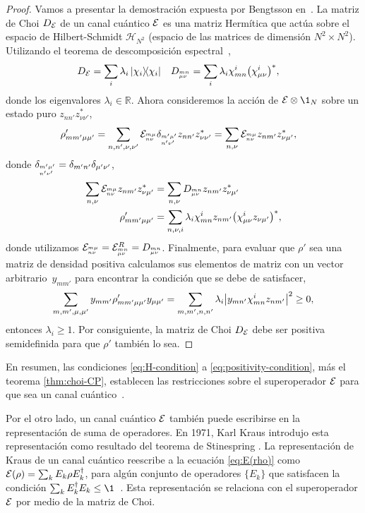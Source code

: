 \begin{proof}
Vamos a presentar la demostración expuesta por Bengtsson
en~\cite[p. 281]{bengtsson_zyczkowski_2017}.
La matriz de Choi $D_{\mathcal{E}}$ de un 
canal cuántico $\mathcal{E}$ es una matriz Hermítica que 
actúa sobre el espacio de Hilbert-Schmidt $\mathcal{H}_{N^2}$
(espacio de las matrices de dimensión $N^2\times N^2$). 
Utilizando el teorema de descomposición 
espectral~\cite{nielsen_chuang_2011},
\begin{align}
D_{\E}&=\sum_{i}\lambda_i\dyad{\chi_i}{\chi_i}
&
D_{\ind{mn}{\mu\nu}}&=\sum_i\lambda_i
\chi^i_{mn}\qty(\chi_{\mu\nu}^i)^*,
\end{align}
donde los eigenvalores $\lambda_i\in\mathbb{R}$. Ahora consideremos
la acción de $\E\ot \1_N$ sobre un estado puro $z_{nn'}z^*_{\nu\nu'}$,
\begin{align}
\rho'_{mm'\mu\mu'}&=
\sum_{n,n',\nu,\nu'}
\mathcal{E}_{{{}^{m\mu}_{n\nu}}}\delta_{{{}^{m'\mu'}_{n'	\nu'}}}z_{nn'}z^*_{\nu\nu'}
=
\sum_{n,\nu}
\mathcal{E}_{{{}^{m\mu}_{n\nu}}}z_{nm'}z^*_{\nu\mu'},
\end{align}
donde $\delta_{{{}^{m'\mu'}_{n'	\nu'}}}=\delta_{m'n'}\delta_{\mu'\nu'}$,
\begin{align}
\sum_{n,\nu}\mathcal{E}_{{{}^{m\mu}_{n\nu}}}z_{nm'}z^*_{\nu\mu'}&=
\sum_{n,\nu}D_{{{}^{mn}_{\mu\nu}}}z_{nm'}z^*_{\nu\mu'}\nonumber\\
\rho'_{mm'\mu\mu'}&=
\sum_{n,\nu,i}\lambda_{i}
\chi^i_{mn}z_{nm'}\qty(\chi_{\mu\nu}^iz_{\nu\mu'})^*,
\end{align}
donde utilizamos $\mathcal{E}_{{{}^{m\mu}_{n\nu}}}
=\mathcal{E}^R_{{{}^{mn}_{\mu\nu}}}
=D_{{{}^{mn}_{\mu\nu}}}$.
Finalmente, para evaluar que $\rho'$ sea una matriz de densidad positiva 
calculamos sus elementos de matriz con un vector arbitrario~$y_{mm'}$
para encontrar la condición que se debe de satisfacer,
\begin{align}
\sum_{m,m',\mu,\mu'}
y_{mm'}\rho'_{mm'\mu\mu'}y_{\mu\mu'}=
\sum_{m,m',n,n'}\lambda_i\abs{
y_{mn'}\chi^i_{mn}z_{nm'}}^2
\geq0,
\end{align}
entonces $\lambda_i\geq1$. Por consiguiente, la matriz 
de Choi $D_{\mathcal{E}}$ debe ser positiva semidefinida para que $\rho'$ 
también lo sea.
\end{proof}
En resumen, las condiciones \eqref{eq:H-condition} 
a \eqref{eq:positivity-condition}, más el teorema \eqref{thm:choi-CP},
establecen las restricciones sobre el superoperador $\mathcal{E}$ para que sea
un canal cuántico~\cite{bengtsson_zyczkowski_2017}.

Por el otro lado, un canal cuántico $\mathcal{E}$ también puede escribirse
en la representación de suma de operadores.
En 1971, Karl Kraus introdujo esta representación como resultado
del teorema de Stinespring \cite{bengtsson_zyczkowski_2017}.
La representación de Kraus de un canal cuántico reescribe
a la ecuación \eqref{eq:E(rho)} como
$\mathcal{E}\qty(\rho)=\sum_k E_k\rho E_k^{\dagger}$,
para algún conjunto de operadores $\{E_k\}$ 
que satisfacen la condición 
$\sum _kE_k^{\dagger}E_k\leq\1$~\cite{nielsen_chuang_2011}. 
Esta representación se relaciona con el superoperador $\mathcal{E}$ por
medio de la matriz de Choi.

